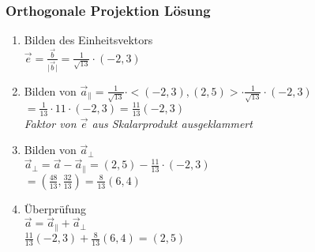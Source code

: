 \begin{frame}
    \frametitle{Orthogonale Projektion Lösung}
    \begin{enumerate}
        \item Bilden des Einheitsvektors \\
        $\vec{e} = \frac{\vec{b}}{\lvert \vec{b} \rvert} = \frac{1}{\sqrt{13}} \cdot (-2, 3)$\\
        \item Bilden von 
        $\vec{a}_{\parallel} = \frac{1}{\sqrt{13}} \cdot <(-2, 3), (2, 5)> \cdot \frac{1}{\sqrt{13}} \cdot (-2, 3)$ \\
        $= \frac{1}{13} \cdot 11 \cdot (-2, 3) = \frac{11}{13}(-2, 3)$\\
        \textit{Faktor von $\vec{e}$  aus Skalarprodukt ausgeklammert}\\
        \item Bilden von $\vec{a}_{\perp}$ \\
        $\vec{a}_{\perp} = \vec{a} - \vec{a}_{\parallel} = (2, 5) - \frac{11}{13} \cdot (-2, 3)$\\
        $= (\frac{48}{13}, \frac{32}{13}) = \frac{8}{13}(6, 4)$\\
        \item Überprüfung \\
        $\vec{a} = \vec{a}_{\parallel} + \vec{a}_{\perp}$\\
        $\frac{11}{13}(-2, 3) + \frac{8}{13}(6, 4) = (2, 5)$ \\
    \end{enumerate}
\end{frame}
